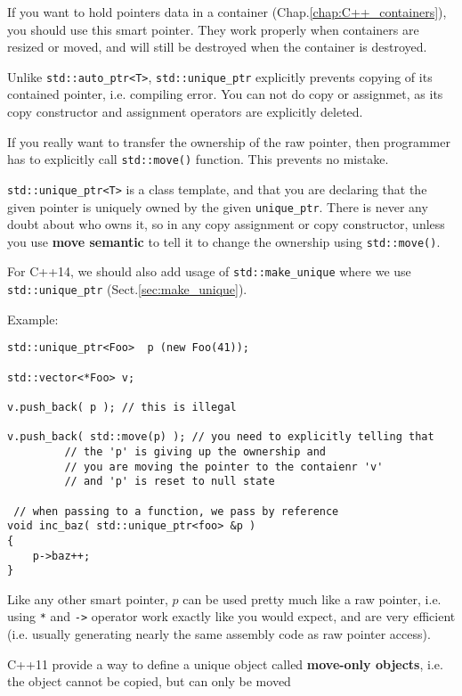 If you want to hold pointers data in a container
(Chap.\ref{chap:C++_containers}), you should use this smart pointer.
They work properly when containers are resized or moved, and will still be
destroyed when the container is destroyed.

Unlike \verb!std::auto_ptr<T>!, \verb!std::unique_ptr! explicitly prevents
copying of its contained pointer, i.e. compiling error.
You can not do copy or assignmet, as its copy constructor and assignment
operators are explicitly deleted.
 
If you really want to transfer the ownership of the raw pointer, then programmer
has to explicitly call \verb!std::move()! function. This prevents no mistake.


\verb!std::unique_ptr<T>! is a class template, and that you are declaring that
the given pointer is uniquely owned by the given \verb!unique_ptr!.
There is never any doubt about who owns it, so in any copy assignment or copy
constructor, unless you use {\bf move semantic} to tell it to change the
ownership using \verb!std::move()!.

For C++14, we should also add usage of \verb!std::make_unique! where we use
\verb!std::unique_ptr! (Sect.\ref{sec:make_unique}).


Example:

\begin{lstlisting}
std::unique_ptr<Foo>  p (new Foo(41));

std::vector<*Foo> v;

v.push_back( p ); // this is illegal

v.push_back( std::move(p) ); // you need to explicitly telling that
         // the 'p' is giving up the ownership and 
         // you are moving the pointer to the contaienr 'v'
         // and 'p' is reset to null state
 
 // when passing to a function, we pass by reference        
void inc_baz( std::unique_ptr<foo> &p )
{
    p->baz++;
}         
\end{lstlisting}
Like any other smart pointer, $p$ can be used pretty much like a raw pointer,
i.e. using \verb!*! and \verb!->! operator work exactly like you would expect,
and are very efficient (i.e. usually generating nearly the same assembly code as
raw pointer access). 

C++11 provide a way to define a unique object called {\bf move-only objects},
i.e. the object cannot be copied, but can only be moved 


